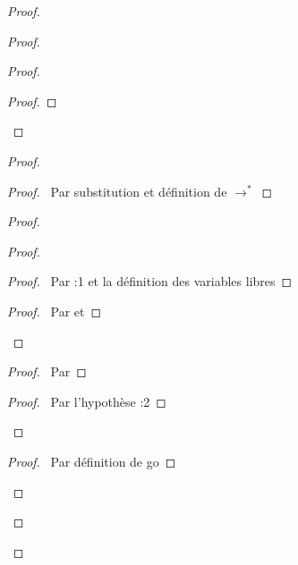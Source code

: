 \documentclass[a4paper]{article}
\begin{document}
\begin{proof}
\begin{proof}
\begin{proof}
\begin{proof}
      \end{proof}
    \end{proof}
    \begin{proof}
      \begin{proof}
        \pf\ Par substitution et définition de $\to^*$
      \end{proof}
      \begin{proof}
        \begin{proof}
          \begin{proof}
            \pf\ Par :1 et la définition des variables libres
          \end{proof}
          \qedstep
          \begin{proof}
            \pf\ Par  et 
          \end{proof}
        \end{proof}
        \begin{proof}
          \pf\ Par 
        \end{proof}
        \qedstep
        \begin{proof}
          \pf\ Par l'hypothèse :2
        \end{proof}
      \end{proof}
      \begin{proof}
        \pf\ Par définition de \textsf{go}
      \end{proof}
    \end{proof}
  \end{proof}
\end{proof}
\end{document}
